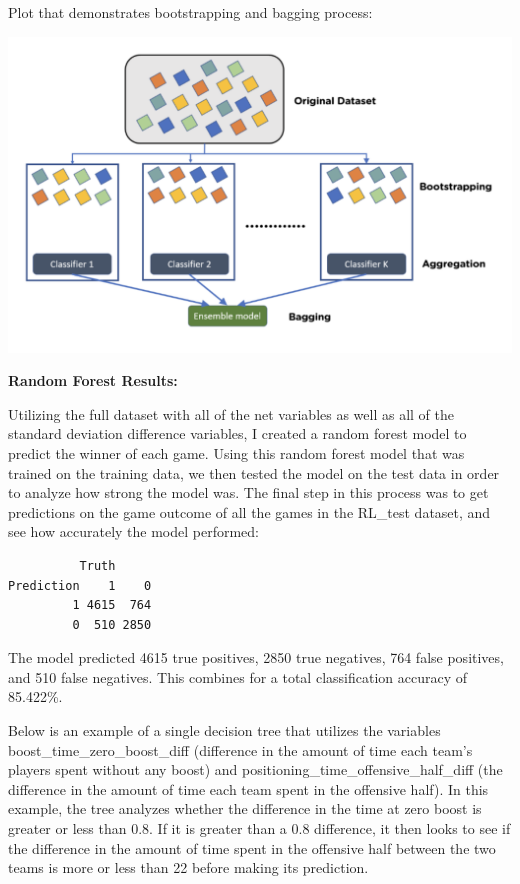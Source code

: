 \documentclass[
  letterpaper,
  DIV=11,
  numbers=noendperiod]{scrartcl}
\begin{document}
Plot that demonstrates bootstrapping and bagging process:

\includegraphics{../Images/Bootstrapping_Bagging_img.png}

\textbf{Random Forest Results:}

Utilizing the full dataset with all of the net variables as well as all
of the standard deviation difference variables, I created a random
forest model to predict the winner of each game. Using this random
forest model that was trained on the training data, we then tested the
model on the test data in order to analyze how strong the model was. The
final step in this process was to get predictions on the game outcome of
all the games in the RL\_test dataset, and see how accurately the model
performed:

\begin{verbatim}
          Truth
Prediction    1    0
         1 4615  764
         0  510 2850
\end{verbatim}

The model predicted 4615 true positives, 2850 true negatives, 764 false
positives, and 510 false negatives. This combines for a total
classification accuracy of 85.422\%.

Below is an example of a single decision tree that utilizes the
variables boost\_time\_zero\_boost\_diff (difference in the amount of
time each team's players spent without any boost) and
positioning\_time\_offensive\_half\_diff (the difference in the amount
of time each team spent in the offensive half). In this example, the
tree analyzes whether the difference in the time at zero boost is
greater or less than 0.8. If it is greater than a 0.8 difference, it
then looks to see if the difference in the amount of time spent in the
offensive half between the two teams is more or less than 22 before
making its prediction.
\end{document}
